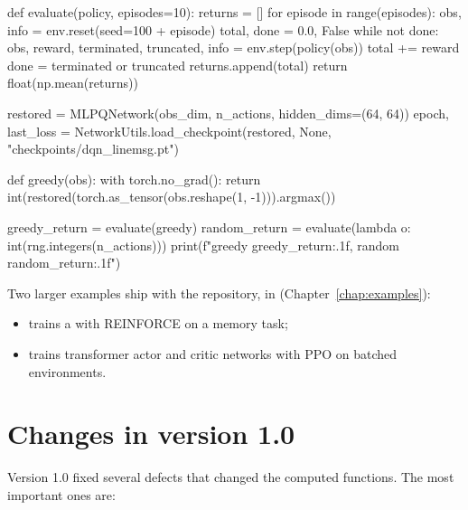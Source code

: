\begin{pycode}
def evaluate(policy, episodes=10):
    returns = []
    for episode in range(episodes):
        obs, info = env.reset(seed=100 + episode)
        total, done = 0.0, False
        while not done:
            obs, reward, terminated, truncated, info = env.step(policy(obs))
            total += reward
            done = terminated or truncated
        returns.append(total)
    return float(np.mean(returns))

restored = MLPQNetwork(obs_dim, n_actions, hidden_dims=(64, 64))
epoch, last_loss = NetworkUtils.load_checkpoint(restored, None,
                                                "checkpoints/dqn_linemsg.pt")

def greedy(obs):
    with torch.no_grad():
        return int(restored(torch.as_tensor(obs.reshape(1, -1))).argmax())

greedy_return = evaluate(greedy)
random_return = evaluate(lambda o: int(rng.integers(n_actions)))
print(f"greedy {greedy_return:.1f}, random {random_return:.1f}")
\end{pycode}

Two larger examples ship with the repository, in 
(Chapter~\ref{chap:examples}):
\begin{itemize}
  \item {} trains a
     with REINFORCE on a memory task;
  \item {} trains transformer actor and critic
    networks with PPO on batched environments.
\end{itemize}

\section{Changes in version 1.0}\label{sec:neural-changes}

Version 1.0 fixed several defects that changed the computed functions. The
most important ones are:

